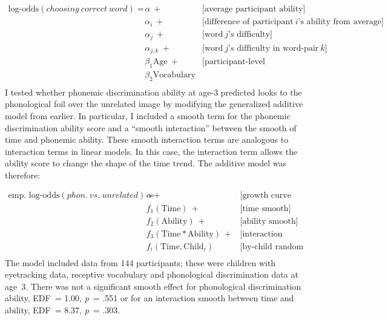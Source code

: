 \documentclass [11pt, proquest] {uwthesis}[2015/03/03]
\begin{document}
\small
\begin{align*}
   \text{log-odds}(\mathit{choosing\ correct\ word}) =\
   & \alpha\ +                  &\text{[average participant ability]} \\
   & \alpha_i\ +                &\text{[difference of participant}\ i
                                       \text{'s ability from average]} \\
   & \alpha_j\ +                &\text{[word}\ j\text{'s difficulty]} \\
   & \alpha_{j,k}\ +            &\text{[word}\ j
                                       \text{'s difficulty in word-pair}\ k] \\
   & \beta_{1}\text{Age}\ +     &\text{[participant-level predictors]} \\
   & \beta_{2}\text{Vocabulary} & \\
\end{align*}
I tested whether phonemic discrimination ability at age-3 predicted
looks to the phonological foil over the unrelated image by modifying the
generalized additive model from earlier. In particular, I included a
smooth term for the phonemic discrimination ability score and a ``smooth
interaction'' between the smooth of time and phonemic ability. These
smooth interaction terms are analogous to interaction terms in linear
models. In this case, the interaction term allows the ability score to
change the shape of the time trend. The additive model was therefore:

\small
\begin{align*}
   \text{emp. log-odds}(\mathit{phon.\ vs.\ unrelated}) =\
   & \alpha +\ &\text{[growth curve average]} \\
   & f_1(\text{Time})\ +                    &\text{[time smooth]} \\
   & f_2(\text{Ability})\ +                 &\text{[ability smooth]} \\
   & f_3(\text{Time} * \text{Ability})\ +   &\text{[interaction smooth]} \\
   & f_i(\text{Time}, \text{Child}_i)       &\text{[by-child random smooths]} \\
\end{align*}
The model included data from 144 participants; these were children with
eyetracking data, receptive vocabulary and phonological discrimination
data at age~3. There was not a significant smooth effect for
phonological discrimination ability, EDF~= 1.00, \emph{p}~= .551 or for
an interaction smooth between time and ability, EDF~= 8.37, \emph{p}~=
.303.
\end{document}
